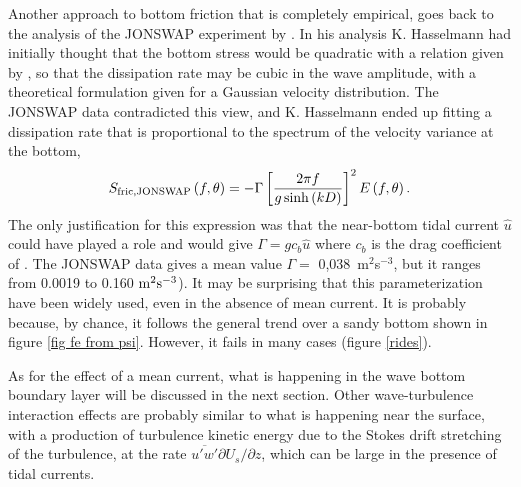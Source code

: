 Another approach to bottom friction that is completely empirical, goes back to the analysis of the JONSWAP experiment 
by \cite{JONSWAP}. In his analysis K. Hasselmann had initially thought that the bottom stress would be quadratic 
with a relation given by \cite{Hasselmann&Collins1968}, so that the dissipation rate may be cubic in the wave amplitude, with a theoretical formulation given for a Gaussian velocity distribution. The JONSWAP data 
contradicted this view, and  K. Hasselmann ended up fitting a dissipation rate that is proportional to the spectrum of 
the velocity variance at the bottom,
\begin{equation}
S_{\mathrm{fric,JONSWAP}}\left(f,\theta\right) =-\Gamma \left[ \frac{2\upi f}{%
g\sinh \left( kD\right) }\right] ^{2}E\left(f,\theta\right).  \label{JONSWAP}
\end{equation}
The only justification for this expression was that the near-bottom tidal current $\widehat{u}$ could have played a role
and would give $\Gamma = g c_b \widehat{u}$ where $c_b$ is the drag coefficient of \cite{Hasselmann&Collins1968}. The JONSWAP data gives a mean value $\Gamma =$ 0,038~m$^{2}$s$^{-3}$, but it ranges from 0.0019 to 0.160 ${\rm
m}^{2}{\rm s}^{-3}$). 
It may be surprising that this parameterization have been widely used, even in the absence of mean current. It is probably because, 
by chance, it follows the general trend over a sandy bottom shown in figure \ref{fig fe from psi}. However, it fails in many cases  (figure \ref{rides}).

As for the effect of a mean current, what is happening in the wave bottom boundary layer will be discussed in the next section. Other wave-turbulence interaction effects 
are probably similar to what is happening near the surface, with a production of turbulence kinetic energy due to the Stokes drift 
stretching of the turbulence, at the rate $\overline{u'w'}\partial U_s /\partial z$, which can be large in the presence of tidal currents.%

